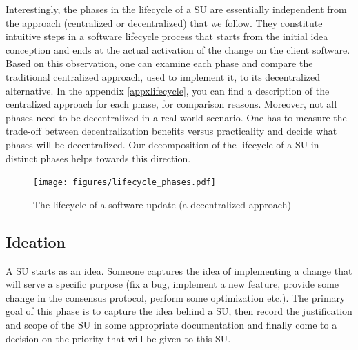 Interestingly, the phases in the lifecycle of a SU are essentially independent from the approach (centralized or decentralized) that we follow. They constitute intuitive steps in a software lifecycle process that starts from the initial idea conception and ends at the actual activation of the change on the client software. Based on this observation, one can examine each phase and compare the traditional centralized approach, used to implement it, to its decentralized alternative. In the appendix
\ref{appxlifecycle}, you can find a description of the centralized approach for each phase, for comparison reasons. Moreover, not all phases need to be decentralized in a real world scenario. One has to measure the trade-off between decentralization benefits versus practicality and decide what phases will be decentralized. Our decomposition of the lifecycle of a SU in distinct phases helps towards this direction.

\begin{figure}[h!] %
    \caption{The lifecycle of a software update (a decentralized approach)}
    \centering
    \texttt{[image: figures/lifecycle\_phases.pdf]}
    \label{lifecycle}
\end{figure}

\subsection{Ideation}
A SU starts as an idea. Someone captures the idea of implementing a change that will serve a specific purpose (fix a bug, implement a new feature, provide some change in the consensus protocol, perform some optimization etc.). The primary goal of this phase is to capture the idea behind a SU, then record the justification and scope of the SU in some appropriate documentation and finally come to a decision on the priority that will be given to this SU. 


